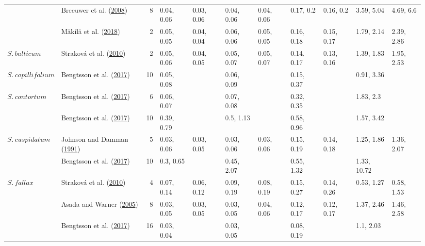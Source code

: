 \documentclass[
  12pt,
]{article}
\begin{document}
\begin{table}[H]
{\begin{tabular}[t]{llrllllllll}
 & Breeuwer et al. (\protect\hyperlink{ref-Breeuwer.2008}{2008}) & 8 & 0.04, 0.06 & 0.03, 0.06 & 0.04, 0.06 & 0.04, 0.06 & 0.17, 0.2 & 0.16, 0.2 & 3.59, 5.04 & 4.69, 6.6\\

 & Mäkilä et al. (\protect\hyperlink{ref-Makila.2018}{2018}) & 2 & 0.05, 0.05 & 0.04, 0.04 & 0.06, 0.06 & 0.05, 0.05 & 0.16, 0.18 & 0.15, 0.17 & 1.79, 2.14 & 2.39, 2.86\\

\multirow[t]{-4}{*}{\raggedright\arraybackslash $S.~balticum$} & Straková et al. (\protect\hyperlink{ref-Strakova.2010}{2010}) & 2 & 0.05, 0.06 & 0.04, 0.05 & 0.05, 0.07 & 0.05, 0.07 & 0.14, 0.17 & 0.13, 0.16 & 1.39, 1.83 & 1.95, 2.53\\
\cmidrule{1-11}
$S.~capillifolium$ & Bengtsson et al. (\protect\hyperlink{ref-Bengtsson.2017}{2017}) & 10 & 0.05, 0.08 &  & 0.06, 0.09 &  & 0.15, 0.37 &  & 0.91, 3.36 & \\
\cmidrule{1-11}
$S.~contortum$ & Bengtsson et al. (\protect\hyperlink{ref-Bengtsson.2017}{2017}) & 6 & 0.06, 0.07 &  & 0.07, 0.08 &  & 0.32, 0.35 &  & 1.83, 2.3 & \\
\cmidrule{1-11}
 & Bengtsson et al. (\protect\hyperlink{ref-Bengtsson.2017}{2017}) & 10 & 0.39, 0.79 &  & 0.5, 1.13 &  & 0.58, 0.96 &  & 1.57, 3.42 & \\

\multirow[t]{-2}{*}{\raggedright\arraybackslash $S.~cuspidatum$} & Johnson and Damman (\protect\hyperlink{ref-Johnson.1991}{1991}) & 5 & 0.03, 0.06 & 0.03, 0.05 & 0.03, 0.06 & 0.03, 0.06 & 0.15, 0.19 & 0.14, 0.18 & 1.25, 1.86 & 1.36, 2.07\\
\cmidrule{1-11}
 & Bengtsson et al. (\protect\hyperlink{ref-Bengtsson.2017}{2017}) & 10 & 0.3, 0.65 &  & 0.45, 2.07 &  & 0.55, 1.32 &  & 1.33, 10.72 & \\

\multirow[t]{-2}{*}{\raggedright\arraybackslash $S.~fallax$} & Straková et al. (\protect\hyperlink{ref-Strakova.2010}{2010}) & 4 & 0.07, 0.14 & 0.06, 0.12 & 0.09, 0.19 & 0.08, 0.19 & 0.15, 0.27 & 0.14, 0.26 & 0.53, 1.27 & 0.58, 1.53\\
\cmidrule{1-11}
 & Asada and Warner (\protect\hyperlink{ref-Asada.2005b}{2005}) & 8 & 0.03, 0.05 & 0.03, 0.05 & 0.03, 0.05 & 0.04, 0.06 & 0.12, 0.17 & 0.12, 0.17 & 1.37, 2.46 & 1.46, 2.58\\

 & Bengtsson et al. (\protect\hyperlink{ref-Bengtsson.2017}{2017}) & 16 & 0.03, 0.04 &  & 0.03, 0.05 &  & 0.08, 0.19 &  & 1.1, 2.03 & \\


\end{tabular}}
\end{table}
\end{document}

